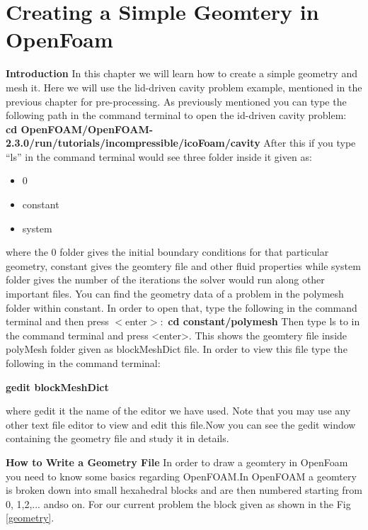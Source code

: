 \documentclass[a4paper,12pt]{report}
\begin{document}
\setcounter{chapter}{1}
\chapter{Creating a Simple Geomtery in OpenFoam}
\flushleft\textbf{Introduction}
\flushleft In this chapter we will learn how to create a simple geometry and mesh it. Here we will use the lid-driven cavity problem example, mentioned in the previous chapter for pre-processing.  As previously mentioned you can type the following path in the command terminal to open the id-driven cavity problem$:$
\flushleft \textbf{cd OpenFOAM/OpenFOAM-2.3.0/run/tutorials/incompressible/icoFoam/cavity}
\flushleft After this if you type “ls” in the command terminal would see three folder inside it given as$:$

\begin{itemize}
\item 0
\item constant
\item system
\end{itemize}

\flushleft where the 0 folder gives the initial boundary conditions for that particular geometry, constant gives the geomtery file and other fluid properties while system folder gives the number of the iterations the solver would run along other important files. You can find the geometry data of a problem in the polymesh folder within constant. In order to open that, type the following in the command terminal and then press $<$enter$>:$
\center \textbf{cd constant/polymesh}
\flushleft Then type ls to in the command terminal and press <enter>. This shows the geomtery file inside polyMesh folder given as blockMeshDict file. In order to view this file type the following in the command terminal$:$

\center \textbf{gedit blockMeshDict}

\flushleft where gedit it the name of the editor we have used. Note that you may use any other text file editor to view and edit this file.Now you can see the gedit window containing the geometry file and study it in details.

\flushleft\textbf{How to Write a Geometry File}
\flushleft In order to draw a geomtery in OpenFoam you need to know some basics regarding OpenFOAM.In OpenFOAM a geomtery is broken down into small hexahedral blocks and are then numbered starting from 0, 1,2,... andso on. For our current problem the block given as shown in the Fig \ref{geometry}.
\end{document}
